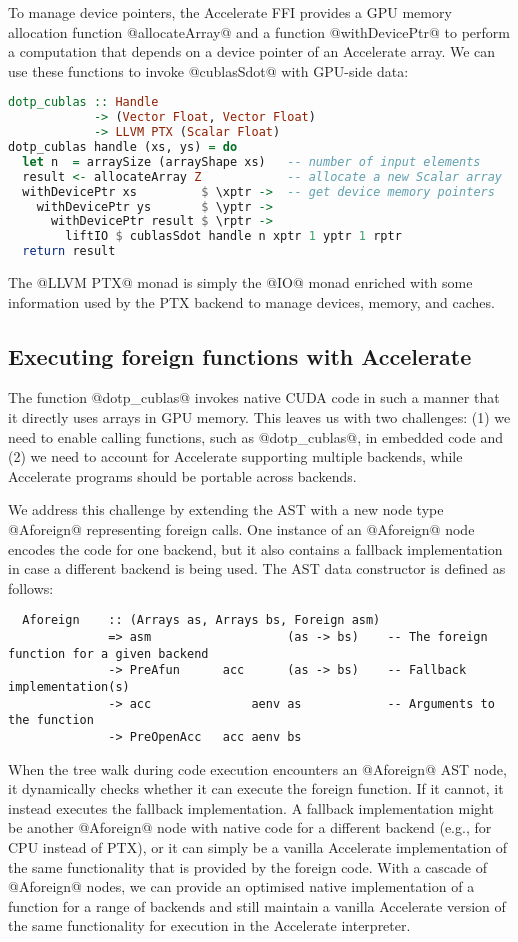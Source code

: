 To manage device pointers, the Accelerate FFI provides a GPU memory allocation function @allocateArray@ and a function @withDevicePtr@ to perform a computation that depends on a device pointer of an Accelerate array. We can use these functions to invoke @cublasSdot@ with GPU-side data:
%
\begin{lstlisting}[language=haskell]
dotp_cublas :: Handle
            -> (Vector Float, Vector Float)
            -> LLVM PTX (Scalar Float)
dotp_cublas handle (xs, ys) = do
  let n  = arraySize (arrayShape xs)   -- number of input elements
  result <- allocateArray Z            -- allocate a new Scalar array
  withDevicePtr xs         $ \xptr ->  -- get device memory pointers
    withDevicePtr ys       $ \yptr ->
      withDevicePtr result $ \rptr ->
        liftIO $ cublasSdot handle n xptr 1 yptr 1 rptr
  return result
\end{lstlisting}
%
The @LLVM PTX@ monad is simply the @IO@ monad enriched with some information used by the PTX backend to manage devices, memory, and caches.

\subsection{Executing foreign functions with Accelerate}

The function @dotp_cublas@ invokes native CUDA code in such a manner that it directly uses arrays in GPU memory. This leaves us with two challenges: (1) we need to enable calling functions, such as @dotp_cublas@, in embedded code and (2) we need to account for Accelerate supporting multiple backends, while Accelerate programs should be portable across backends.

We address this challenge by extending the AST with a new node type @Aforeign@ representing foreign calls. One instance of an @Aforeign@ node encodes the code for one backend, but it also contains a fallback implementation in case a different backend is being used. The AST data constructor is defined as follows:
%
\begin{lstlisting}
  Aforeign    :: (Arrays as, Arrays bs, Foreign asm)
              => asm                   (as -> bs)    -- The foreign function for a given backend
              -> PreAfun      acc      (as -> bs)    -- Fallback implementation(s)
              -> acc              aenv as            -- Arguments to the function
              -> PreOpenAcc   acc aenv bs
\end{lstlisting}
%
When the tree walk during code execution encounters an @Aforeign@ AST node, it dynamically checks whether it can execute the foreign function. If it cannot, it instead executes the fallback implementation. A fallback implementation might be another @Aforeign@ node with native code for a different backend (e.g., for CPU instead of PTX), or it can simply be a vanilla Accelerate implementation of the same functionality that is provided by the foreign code. With a cascade of @Aforeign@ nodes, we can provide an optimised native implementation of a function for a range of backends and still maintain a vanilla Accelerate version of the same functionality for execution in the Accelerate interpreter.

